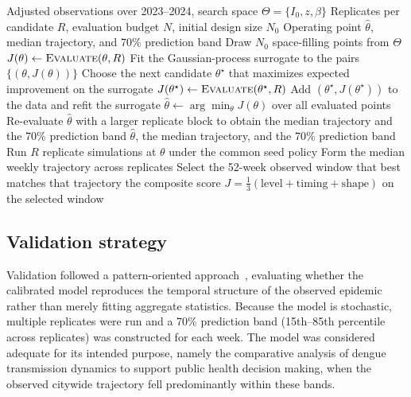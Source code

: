 \documentclass[applsci,article,accept,pdftex,moreauthors]{Definitions/mdpi}
\begin{document}
\begin{algorithm}[H]
\caption{Surrogate-based multi-parameter calibration.}
\label{alg:calibration}
\begin{algorithmic}[1]
\Require Adjusted observations over 2023--2024, search space $\Theta=\{I_0,z,\beta\}$
\Require Replicates per candidate $R$, evaluation budget $N$, initial design size $N_0$
\Ensure Operating point $\hat\theta$, median trajectory, and 70\% prediction band
\State Draw $N_0$ space-filling points from $\Theta$ 
  \State $J(\theta) \leftarrow \textsc{Evaluate}(\theta, R)$
\EndFor
\State Fit the Gaussian-process surrogate to the pairs $\{(\theta, J(\theta))\}$
  \State Choose the next candidate $\theta^\star$ that maximizes expected improvement on the surrogate
  \State $J(\theta^\star) \leftarrow \textsc{Evaluate}(\theta^\star, R)$
  \State Add $(\theta^\star, J(\theta^\star))$ to the data and refit the surrogate
\EndWhile
\State $\hat\theta \leftarrow \arg\min_\theta J(\theta)$ over all evaluated points
\State Re-evaluate $\hat\theta$ with a larger replicate block to obtain the median trajectory and the 70\% prediction band
\State \Return $\hat\theta$, the median trajectory, and the 70\% prediction band
\Statex
{}
  \State Run $R$ replicate simulations at $\theta$ under the common seed policy
  \State Form the median weekly trajectory across replicates
  \State Select the 52-week observed window that best matches that trajectory
  \State \Return the composite score $J=\tfrac13(\text{level}+\text{timing}+\text{shape})$ on the selected window
\EndFunction
\end{algorithmic}
\end{algorithm}

\subsection{Validation strategy}
\label{sec:validation}

Validation followed a pattern-oriented approach~\cite{validationOverview}, evaluating whether the calibrated model reproduces the temporal structure of the observed epidemic rather than merely fitting aggregate statistics. Because the model is stochastic, multiple replicates were run and a 70\% prediction band (15th--85th percentile across replicates) was constructed for each week. The model was considered adequate for its intended purpose, namely the comparative analysis of dengue transmission dynamics to support public health decision making, when the observed citywide trajectory fell predominantly within these bands.
\end{document}
